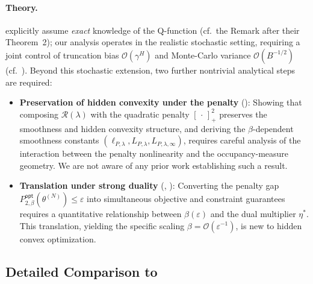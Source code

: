 \documentclass{article}
\theoremstyle{plain}
\theoremstyle{definition}
\theoremstyle{remark}
\def\epsilon{{\varepsilon}}
\newcommand{\innerEmpty}{\,\cdot\,}
\def\optLabel{\mathsf{opt}}
\newcommand{\penOpt}[1]{P^\optLabel_{#1}}
\def\thetaN{{\theta^{(N)}}}
\begin{document}
\paragraph{Theory.}
\citet{zhangVariationalPolicyGradient2020} explicitly assume \emph{exact}
knowledge of the Q-function (cf.\ the Remark after their Theorem~2);
our analysis operates in the realistic stochastic setting, requiring a joint
control of truncation bias $\mathcal{O}(\gamma^H)$ and Monte-Carlo variance
$\mathcal{O}(B^{-1/2})$ (cf.\ ).
Beyond this stochastic extension, two further nontrivial analytical steps
are required:
\begin{itemize}
 \item \textbf{Preservation of hidden convexity under the penalty}
       ():
       Showing that composing $\mathcal{R}(\lambda)$ with the quadratic penalty
       $[\innerEmpty{}]_+^2$
       preserves the smoothness and hidden convexity structure, and deriving the
       $\beta$-dependent smoothness constants $(\ell_{P, \lambda}, L_{P, \lambda}, L_{P, \lambda, \infty})$,
       requires careful analysis of the interaction between the penalty nonlinearity and the
       occupancy-measure geometry. We are not aware of any prior work establishing such a result.
 \item \textbf{Translation under strong duality}
       (,
       ):
       Converting the penalty gap
       $\penOpt{2,\beta}(\thetaN) \leq \epsilon$ into simultaneous objective and
       constraint guarantees requires a quantitative relationship between $\beta(\varepsilon)$ and
       the dual multiplier $\eta^*$. This translation, yielding the specific scaling
       $\beta = \mathcal{O}(\varepsilon^{-1})$, is new to hidden convex optimization.
\end{itemize}

\subsection{Detailed Comparison to \citet{fatkhullinStochasticOptimizationHidden2025}}
\end{document}
